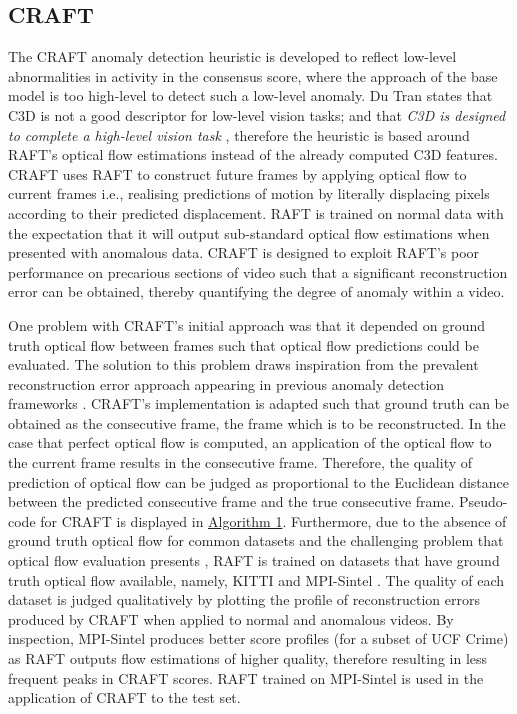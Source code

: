 \documentclass[sigplan,authorversion,nonacm, 9pt]{acmart}
\begin{document}
\subsection{CRAFT}
 The CRAFT anomaly detection heuristic is developed to reflect low-level abnormalities in activity in the consensus score, where the approach of the base model is too high-level to detect such a low-level anomaly. Du Tran states that C3D is not a good descriptor for low-level vision tasks; and that \textit{C3D is designed to complete a high-level vision task} \cite{dutran2}, therefore the heuristic is based around RAFT's optical flow estimations instead of the already computed C3D features.
CRAFT uses RAFT \cite{raft} to construct future frames by applying optical flow to current frames i.e., realising predictions of motion by literally displacing pixels according to their predicted displacement. 
RAFT is trained on normal data with the expectation that it will output sub-standard optical flow estimations when presented with anomalous data. CRAFT is designed to exploit RAFT's poor performance on precarious sections of video such that a significant reconstruction error can be obtained, thereby quantifying the degree of anomaly within a video. 
\par
One problem with CRAFT's initial approach was that it depended on ground truth optical flow between frames such that optical flow predictions could be evaluated. The solution to this problem draws inspiration from the prevalent reconstruction error approach appearing in previous anomaly detection frameworks \cite{nguyen} \cite{park}. CRAFT's implementation is adapted such that ground truth can be obtained as the consecutive frame, the frame which is to be reconstructed. In the case that perfect optical flow is computed, an application of the optical flow to the current frame results in the consecutive frame. Therefore, the quality of prediction of optical flow can be judged as proportional to the Euclidean distance between the predicted consecutive frame and the true consecutive frame. Pseudo-code for CRAFT is displayed in \hyperref[fig:psCRAFT]{Algorithm 1}.
Furthermore, due to the absence of ground truth optical flow for common datasets and the challenging problem that optical flow evaluation presents \cite{floweval}, RAFT is trained on datasets that have ground truth optical flow available, namely, KITTI \cite{kitti} and MPI-Sintel \cite{mpisintel}. The quality of each dataset is judged qualitatively by plotting the profile of reconstruction errors produced by CRAFT when applied to normal and anomalous videos. By inspection, MPI-Sintel produces better score profiles (for a subset of UCF Crime) as RAFT outputs flow estimations of higher quality, therefore resulting in less frequent peaks in CRAFT scores. RAFT trained on MPI-Sintel is used in the application of CRAFT to the test set.
\end{document}
